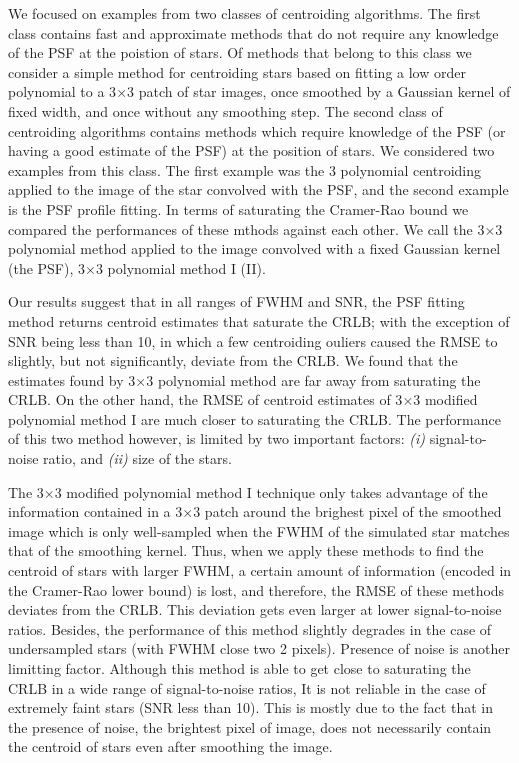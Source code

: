 \documentclass[12pt, preprint]{aastex}
\begin{document}
We focused on examples from two classes of centroiding algorithms. The first class contains fast and approximate
methods that do not require any knowledge of the PSF at the poistion of stars. Of methods that belong to this class
we consider a simple method for centroiding stars based on fitting a low order
polynomial to a 3$\times$3 patch of star images, once smoothed by a Gaussian kernel of fixed width, and once without any smoothing step. 
The second class of centroiding algorithms contains methods which require knowledge of the PSF (or having a good estimate
of the PSF) at the position of stars. We considered two examples from this class. The first example
was the 3 polynomial centroiding applied to the image of the star convolved with the PSF, and the
second example is the PSF profile fitting. In terms of saturating the Cramer-Rao bound we compared 
the performances of these mthods against each other. We call the 3$\times$3 polynomial method applied 
to the image convolved with a fixed Gaussian kernel (the PSF), 3$\times$3 polynomial method I (II).

Our results suggest that in all ranges of FWHM and SNR, the PSF fitting method returns 
centroid estimates that saturate the CRLB; with the exception of SNR being less than 10, 
in which a few centroiding ouliers caused the RMSE to slightly, but not significantly, deviate
from the CRLB. We found that the estimates found by 3$\times$3 polynomial method are far away from
saturating the CRLB. On the other hand, the RMSE of centroid estimates of 
3$\times$3 modified polynomial method I are much closer to saturating the CRLB.
The performance of this two method however, is limited by
two important factors: \emph{(i)} signal-to-noise ratio, and \emph{(ii)} size of the stars.

The 3$\times$3 modified polynomial method I technique only takes advantage of the information contained in a 3$\times$3
patch around the brighest pixel of the smoothed image which is only well-sampled when the FWHM of the simulated star
 matches that of the smoothing kernel. Thus, when we apply 
these methods to find the centroid of stars with larger FWHM, a certain amount of
information (encoded in the Cramer-Rao lower bound) is lost, and therefore, the RMSE
of these methods deviates from the CRLB. This deviation gets even larger at lower
signal-to-noise ratios. Besides, the performance of this method slightly degrades
in the case of undersampled stars (with FWHM close two 2 pixels). 
Presence of noise is another limitting factor.
Although this method is able to get close to saturating the CRLB in a wide range of
signal-to-noise ratios, It is not reliable in the case of extremely faint stars
(SNR less than 10). This is mostly due to the fact that in the presence of noise, 
the brightest pixel of image, does not necessarily contain the centroid of stars even after smoothing 
the image.
\end{document}

